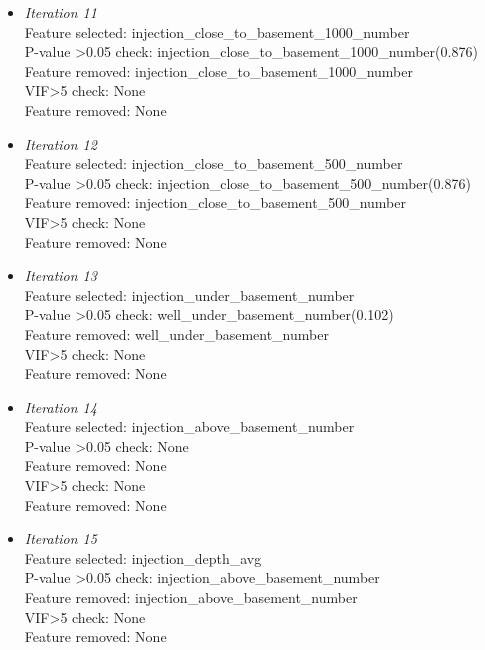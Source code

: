 \documentclass[final-report]{report-template}
\begin{document}
\begin{itemize}
    \item \textit{Iteration 11}\\
    Feature selected: injection\_close\_to\_basement\_1000\_number\\
    P-value \textgreater 0.05 check: injection\_close\_to\_basement\_1000\_number(0.876)\\
    Feature removed: injection\_close\_to\_basement\_1000\_number\\
    VIF\textgreater 5 check: None\\
    Feature removed: None\\
    
    
    \item \textit{Iteration 12}\\
    Feature selected: injection\_close\_to\_basement\_500\_number\\
    P-value \textgreater 0.05 check: injection\_close\_to\_basement\_500\_number(0.876)\\
    Feature removed: injection\_close\_to\_basement\_500\_number\\
    VIF\textgreater 5 check: None\\
    Feature removed: None\\
    
    \item \textit{Iteration 13}\\
    Feature selected: injection\_under\_basement\_number\\
    P-value \textgreater 0.05 check: well\_under\_basement\_number(0.102)\\
    Feature removed: well\_under\_basement\_number\\
    VIF\textgreater 5 check: None\\
    Feature removed: None\\
    
    
    \item \textit{Iteration 14}\\
    Feature selected: injection\_above\_basement\_number\\
    P-value \textgreater 0.05 check: None\\
    Feature removed: None\\
    VIF\textgreater 5 check: None\\
    Feature removed: None\\
    
    \item \textit{Iteration 15}\\
    Feature selected: injection\_depth\_avg\\
    P-value \textgreater 0.05 check: injection\_above\_basement\_number\\
    Feature removed: injection\_above\_basement\_number\\
    VIF\textgreater 5 check: None\\
    Feature removed: None\\
    

\end{itemize}
\end{document}
